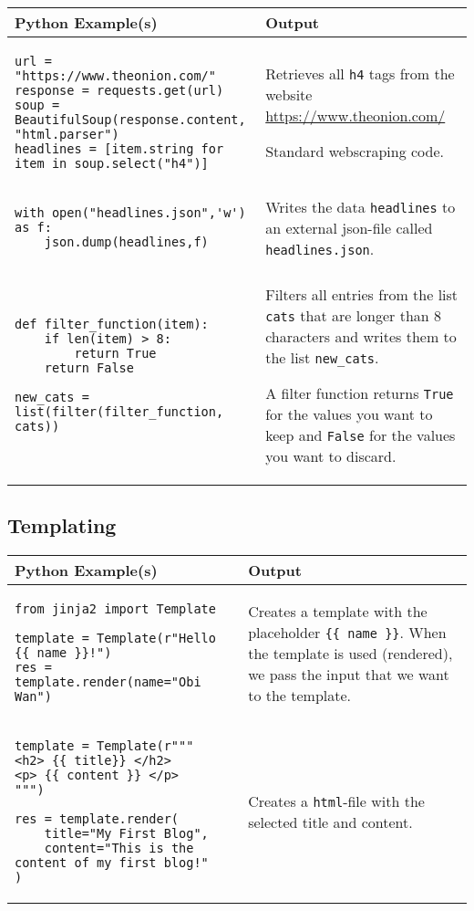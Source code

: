 \documentclass[11pt,a4paper]{report}
\begin{document}
\begin{longtable}{|p{}|p{}|}
\hline
Python  Example(s) & Output  \\
\hline 
\endhead
 \begin{lstlisting}
url = "https://www.theonion.com/"
response = requests.get(url)
soup = BeautifulSoup(response.content, "html.parser")
headlines = [item.string for item in soup.select("h4")]
\end{lstlisting}  & Retrieves all \verb|h4| tags from the website \url{https://www.theonion.com/}

Standard webscraping code. \\
\hline
\begin{lstlisting}
with open("headlines.json",'w') as f:
    json.dump(headlines,f)
\end{lstlisting} &
Writes the data \verb|headlines| to an external json-file called \verb|headlines.json|. \\
\hline
\begin{lstlisting}
def filter_function(item):
    if len(item) > 8:
        return True
    return False

new_cats = list(filter(filter_function, cats))
\end{lstlisting} &
Filters all entries from the list \verb|cats| that are longer than $8$ characters and writes  them to the list \verb|new_cats|.

A filter function returns \verb|True| for the values you want to keep and \verb|False| for the values you want to discard. \\
\hline

\end{longtable}

\subsection{Templating}

\begin{longtable}{|p{}|p{}|}
\hline
Python  Example(s) & Output  \\
\hline 
\endhead
 \begin{lstlisting}
from jinja2 import Template

template = Template(r"Hello {{ name }}!")
res = template.render(name="Obi Wan")
\end{lstlisting}  & Creates a template with the placeholder \verb|{{ name }}|. When the template is used (rendered), we pass the input that we want to the template. \\
\hline
\begin{lstlisting}
template = Template(r"""
<h2> {{ title}} </h2>
<p> {{ content }} </p>
""")

res = template.render(
    title="My First Blog",
    content="This is the content of my first blog!"
)
\end{lstlisting} &
Creates a \verb|html|-file with the selected title and content. \\
\hline

\end{longtable}

\newpage
\end{document}
